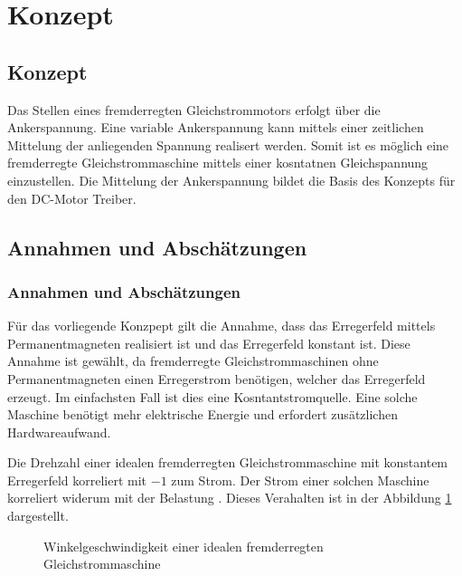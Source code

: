 \ifSTANDALONE
\section{Konzept}
\fi
\ifEMBED
\subsection{Konzept}
\fi

Das Stellen eines fremderregten Gleichstrommotors erfolgt über die
Ankerspannung. Eine variable Ankerspannung kann mittels einer 
zeitlichen Mittelung der anliegenden Spannung realisert werden. Somit
ist es möglich eine fremderregte Gleichstrommaschine mittels einer
kosntatnen Gleichspannung einzustellen. Die Mittelung der Ankerspannung
bildet die Basis des Konzepts für den DC-Motor Treiber.

\ifSTANDALONE
\subsection{Annahmen und Abschätzungen}
\fi
\ifEMBED
\subsubsection{Annahmen und Abschätzungen}
\fi
Für das vorliegende Konzpept gilt die Annahme, dass das Erregerfeld mittels
Permanentmagneten realisiert ist und das Erregerfeld konstant ist. Diese
Annahme ist gewählt, da fremderregte Gleichstrommaschinen ohne
Permanentmagneten einen Erregerstrom benötigen, welcher das Erregerfeld
erzeugt. Im einfachsten Fall ist dies eine Kosntantstromquelle. Eine solche
Maschine benötigt mehr elektrische Energie und erfordert zusätzlichen
Hardwareaufwand.

Die Drehzahl einer idealen fremderregten Gleichstrommaschine mit konstantem
Erregerfeld korreliert mit $-1$ zum Strom. Der Strom einer solchen Maschine
korreliert widerum mit der Belastung \cite{smps}. Dieses Verahalten ist in
der Abbildung \ref{fig:ideal-dc-curve} dargestellt.

\begin{figure}[h!]
	\centering
	\caption{Winkelgeschwindigkeit einer idealen fremderregten 
		Gleichstrommaschine}
	\label{fig:ideal-dc-curve}
\end{figure}

